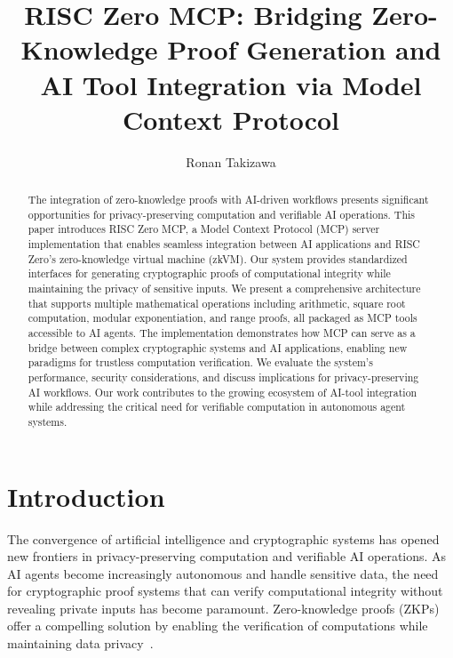 \documentclass[11pt]{article}
\begin{document}
\title{RISC Zero MCP: Bridging Zero-Knowledge Proof Generation and AI Tool Integration via Model Context Protocol}

\author{Ronan Takizawa}


\maketitle

\begin{abstract}
The integration of zero-knowledge proofs with AI-driven workflows presents significant opportunities for privacy-preserving computation and verifiable AI operations. This paper introduces RISC Zero MCP, a Model Context Protocol (MCP) server implementation that enables seamless integration between AI applications and RISC Zero's zero-knowledge virtual machine (zkVM). Our system provides standardized interfaces for generating cryptographic proofs of computational integrity while maintaining the privacy of sensitive inputs. We present a comprehensive architecture that supports multiple mathematical operations including arithmetic, square root computation, modular exponentiation, and range proofs, all packaged as MCP tools accessible to AI agents. The implementation demonstrates how MCP can serve as a bridge between complex cryptographic systems and AI applications, enabling new paradigms for trustless computation verification. We evaluate the system's performance, security considerations, and discuss implications for privacy-preserving AI workflows. Our work contributes to the growing ecosystem of AI-tool integration while addressing the critical need for verifiable computation in autonomous agent systems.
\end{abstract}

\section{Introduction}

The convergence of artificial intelligence and cryptographic systems has opened new frontiers in privacy-preserving computation and verifiable AI operations. As AI agents become increasingly autonomous and handle sensitive data, the need for cryptographic proof systems that can verify computational integrity without revealing private inputs has become paramount. Zero-knowledge proofs (ZKPs) offer a compelling solution by enabling the verification of computations while maintaining data privacy~\cite{goldwasser1985knowledge}.
\end{document}
